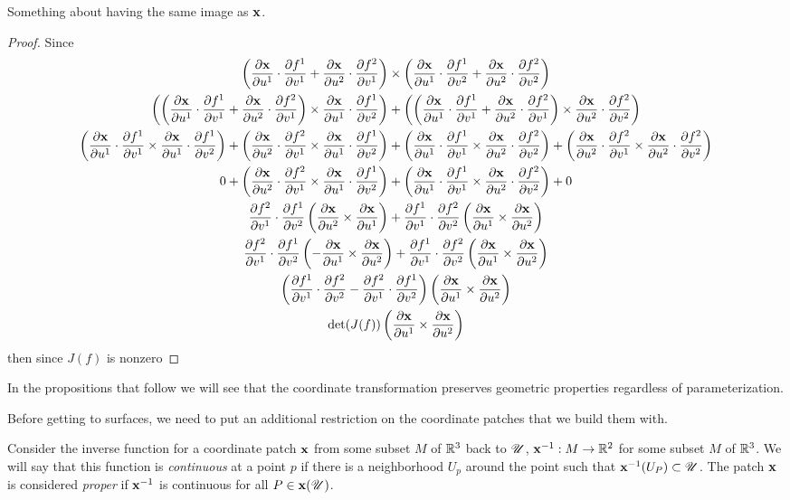 \begin{lem}
  Something about having the same image as $\mathbf{x}$.
\end{lem}

\newcommand{\xdf}[2]{\frac{\del\bx}{\del u^{#1}}\cdot\frac{\del f^{#1}}{\del v^{#2}}}
\newcommand{\df}[2]{\frac{\del f^{#1}}{\del v^{#2}}}
\newcommand{\dx}[1]{\frac{\del\bx}{\del u^{#1}}}
\begin{proof}
  Since
  \begin{gather*}
    \left(\xdf{1}{1} + \xdf{2}{1}\right) \times \left(\xdf{1}{2} + \xdf{2}{2}\right)\\
    \left(\left(\xdf{1}{1} + \xdf{2}{1}\right) \times \xdf{1}{2}\right) + \left(\left(\xdf{1}{1} + \xdf{2}{1}\right) \times \xdf{2}{2}\right)\\
    \left(\xdf{1}{1} \times \xdf{1}{2}\right) + \left(\xdf{2}{1} \times \xdf{1}{2}\right) + \left(\xdf{1}{1} \times \xdf{2}{2}\right) + \left(\xdf{2}{1} \times \xdf{2}{2}\right)\\
    0 + \left(\xdf{2}{1} \times \xdf{1}{2}\right) + \left(\xdf{1}{1} \times \xdf{2}{2}\right) + 0\\
    \df{2}{1}\cdot\df{1}{2}\left(\dx{2} \times \dx{1}\right) + \df{1}{1}\cdot\df{2}{2}\left(\dx{1} \times \dx{2}\right)\\
    \df{2}{1}\cdot\df{1}{2}\left(-\dx{1} \times \dx{2}\right) + \df{1}{1}\cdot\df{2}{2}\left(\dx{1} \times \dx{2}\right)\\
    \left(\df{1}{1}\cdot\df{2}{2} - \df{2}{1}\cdot\df{1}{2}\right)\left(\dx{1} \times \dx{2}\right)\\
    \text{det}(J(f))\left(\dx{1} \times \dx{2}\right)
  \end{gather*}
  then since $J(f)$ is nonzero
\end{proof}

In the propositions that follow we will see that the coordinate transformation preserves geometric properties regardless of parameterization. 


Before getting to surfaces, we need to put an additional restriction on the coordinate patches that we build them with.

Consider the inverse function for a coordinate patch $\mathbf{x}$ from some subset $M$ of $\mathbb{R}^3$ back to $\mathscr{U}$, $\mathbf{x}^{-1}: M \to \mathbb{R}^2$ for some subset $M$ of $\mathbb{R}^3$. We will say that this function is \emph{continuous} at a point $p$ if there is a neighborhood $U_p$ around the point such that $\mathbf{x}^{-1}(U_P)\subset \mathscr{U}$. The patch $\mathbf{x}$ is considered \emph{proper} if $\mathbf{x}^{-1}$ is continuous for all $P \in \mathbf{x}(\mathscr{U})$.

